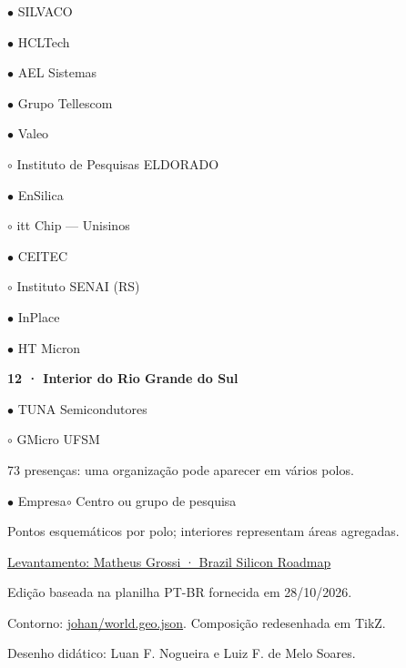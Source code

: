 \documentclass[10pt,a3paper]{article}
\begin{document}
\begin{minipage}[t]{.28\linewidth}
$\bullet$ SILVACO\par
$\bullet$ HCLTech\par
$\bullet$ AEL Sistemas\par
$\bullet$ Grupo Tellescom\par
$\bullet$ Valeo\par
$\circ$ Instituto de Pesquisas ELDORADO\par
$\bullet$ EnSilica\par
$\circ$ itt Chip — Unisinos\par
$\bullet$ CEITEC\par
$\circ$ Instituto SENAI (RS)\par
$\bullet$ InPlace\par
$\bullet$ HT Micron\par
\vspace{2mm}
\textcolor{azul}{\textbf{12 · Interior do Rio Grande do Sul}}\par
$\bullet$ TUNA Semicondutores\par
$\circ$ GMicro UFSM\par
\vspace{2mm}
\end{minipage}\hfill
\begin{minipage}[t]{.40\linewidth}\vspace{0pt}\centering
{}
\par{}\par
\small 73 presenças: uma organização pode aparecer em vários polos.\par\medskip
$\bullet$ Empresa\quad $\circ$ Centro ou grupo de pesquisa\par\medskip
\footnotesize Pontos esquemáticos por polo; interiores representam áreas agregadas.\par\medskip
\href{https://github.com/MattGrossi12/brazil_silicon_roadmap}{Levantamento: Matheus Grossi · Brazil Silicon Roadmap}\par
\footnotesize Edição baseada na planilha PT-BR fornecida em 28/10/2026.\par\medskip
Contorno: \href{https://github.com/johan/world.geo.json/blob/master/countries/BRA.geo.json}{johan/world.geo.json}. Composição redesenhada em TikZ.\par\medskip
Desenho didático: Luan F. Nogueira e Luiz F. de Melo Soares.
\end{minipage}\hfill
\end{document}
